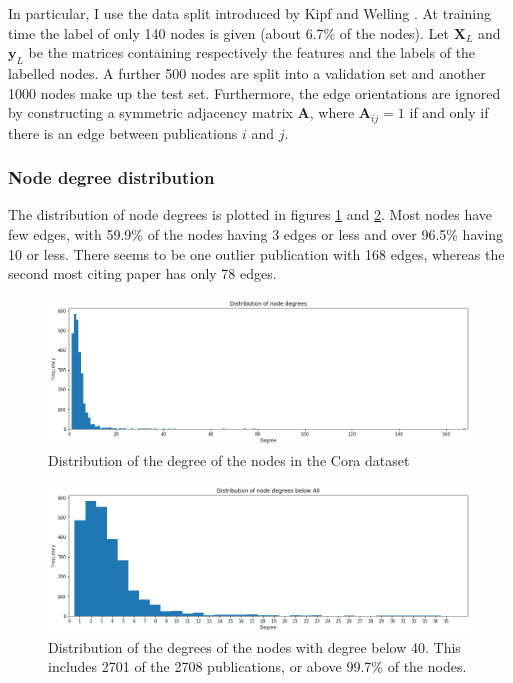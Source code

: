 \documentclass[12pt]{article}
\theoremstyle{definition}
\begin{document}
\bigskip

In particular, I use the data split introduced by Kipf and Welling \cite{kipf2017semi}. At training time the label of only 140 nodes is given (about 6.7\% of the nodes). Let $\mathbf{X}_{L}$ and $\textbf{y}_L$ be the matrices containing respectively the features and the labels of the labelled nodes. A further 500 nodes are split into a validation set and another 1000 nodes make up the test set. Furthermore, the edge orientations are ignored by constructing a symmetric adjacency matrix $\mathbf{A}$, where $\mathbf{A}_{ij} = 1$ if and only if there is an edge between publications $i$ and $j$.

\subsubsection{Node degree distribution}
The distribution of node degrees is plotted in figures \ref{fig/node_degrees} and \ref{fig/node_degrees_truncated}. Most nodes have few edges, with 59.9\% of the nodes having 3 edges or less and over 96.5\% having 10 or less. There seems to be one outlier publication with 168 edges, whereas the second most citing paper has only 78 edges.

\begin{figure}[h]
	\includegraphics[width=1.0\textwidth]{node_degrees}
	\centering
	\caption{Distribution of the degree of the nodes in the Cora dataset}
	\label{fig/node_degrees}
\end{figure}

\begin{figure}[h]
	\includegraphics[width=1.0\textwidth]{node_degrees_truncated}
	\centering
	\caption{Distribution of the degrees of the nodes with degree below 40. This includes 2701 of the 2708 publications, or above 99.7\% of the nodes.}
	\label{fig/node_degrees_truncated}
\end{figure}
\end{document}
